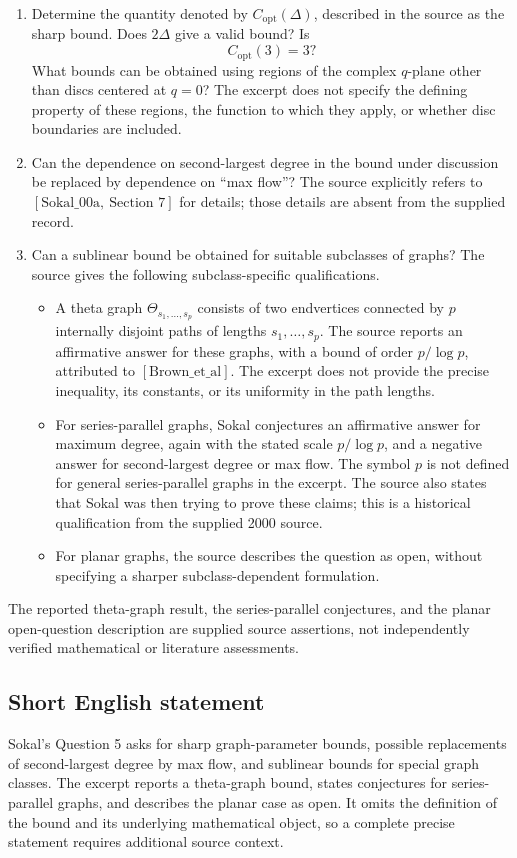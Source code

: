 \documentclass[11pt]{article}
\begin{document}
\begin{enumerate}
\item[(a)] Determine the quantity denoted by \(C_{\mathrm{opt}}(\Delta)\), described in the source as the sharp bound. Does \(2\Delta\) give a valid bound? Is
\[
C_{\mathrm{opt}}(3)=3?
\]
What bounds can be obtained using regions of the complex \(q\)-plane other than discs centered at \(q=0\)? The excerpt does not specify the defining property of these regions, the function to which they apply, or whether disc boundaries are included.

\item[(b)] Can the dependence on second-largest degree in the bound under discussion be replaced by dependence on ``max flow''? The source explicitly refers to \([\mathrm{Sokal\_00a},\ \text{Section }7]\) for details; those details are absent from the supplied record.

\item[(c)] Can a sublinear bound be obtained for suitable subclasses of graphs? The source gives the following subclass-specific qualifications.
\begin{itemize}
\item A theta graph \(\Theta_{s_1,\ldots,s_p}\) consists of two endvertices connected by \(p\) internally disjoint paths of lengths \(s_1,\ldots,s_p\). The source reports an affirmative answer for these graphs, with a bound of order \(p/\log p\), attributed to \([\mathrm{Brown\_et\_al}]\). The excerpt does not provide the precise inequality, its constants, or its uniformity in the path lengths.
\item For series-parallel graphs, Sokal conjectures an affirmative answer for maximum degree, again with the stated scale \(p/\log p\), and a negative answer for second-largest degree or max flow. The symbol \(p\) is not defined for general series-parallel graphs in the excerpt. The source also states that Sokal was then trying to prove these claims; this is a historical qualification from the supplied 2000 source.
\item For planar graphs, the source describes the question as open, without specifying a sharper subclass-dependent formulation.
\end{itemize}
\end{enumerate}

The reported theta-graph result, the series-parallel conjectures, and the planar open-question description are supplied source assertions, not independently verified mathematical or literature assessments.
\subsection{Short English statement}
Sokal's Question 5 asks for sharp graph-parameter bounds, possible replacements of second-largest degree by max flow, and sublinear bounds for special graph classes. The excerpt reports a theta-graph bound, states conjectures for series-parallel graphs, and describes the planar case as open. It omits the definition of the bound and its underlying mathematical object, so a complete precise statement requires additional source context.
\end{document}
